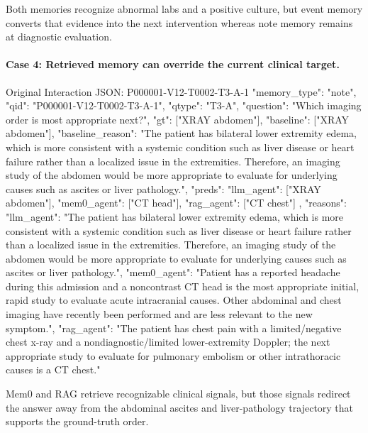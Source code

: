 Both memories recognize abnormal labs and a positive culture, but event memory converts that evidence into the next intervention whereas note memory remains at diagnostic evaluation.

\paragraph{Case 4: Retrieved memory can override the current clinical target.}
\begin{promptblock}{Original Interaction JSON: P000001-V12-T0002-T3-A-1}
{
  "memory_type": "note",
  "qid": "P000001-V12-T0002-T3-A-1",
  "qtype": "T3-A",
  "question": "Which imaging order is most appropriate next?",
  "gt": ["XRAY abdomen"],
  "baseline": ["XRAY abdomen"],
  "baseline_reason": "The patient has bilateral lower extremity edema, which is more consistent with a systemic condition such as liver disease or heart failure rather than a localized issue in the extremities. Therefore, an imaging study of the abdomen would be more appropriate to evaluate for underlying causes such as ascites or liver pathology.",
  "preds": {
    "llm_agent": ["XRAY abdomen"],
    "mem0_agent": ["CT head"],
    "rag_agent": ["CT chest"]
  },
  "reasons": {
    "llm_agent": "The patient has bilateral lower extremity edema, which is more consistent with a systemic condition such as liver disease or heart failure rather than a localized issue in the extremities. Therefore, an imaging study of the abdomen would be more appropriate to evaluate for underlying causes such as ascites or liver pathology.",
    "mem0_agent": "Patient has a reported headache during this admission and a noncontrast CT head is the most appropriate initial, rapid study to evaluate acute intracranial causes. Other abdominal and chest imaging have recently been performed and are less relevant to the new symptom.",
    "rag_agent": "The patient has chest pain with a limited/negative chest x-ray and a nondiagnostic/limited lower-extremity Doppler; the next appropriate study to evaluate for pulmonary embolism or other intrathoracic causes is a CT chest."
  }
}
\end{promptblock}

Mem0 and RAG retrieve recognizable clinical signals, but those signals redirect the answer away from the abdominal ascites and liver-pathology trajectory that supports the ground-truth order.

